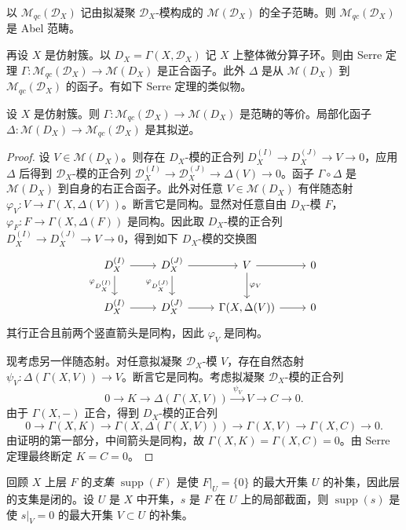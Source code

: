以 $\mathcal{M}_{qc}(\mathcal{D}_X)$ 记由拟凝聚 $\mathcal{D}_X$-模构成的 $\mathcal{M}(\mathcal{D}_X)$ 的全子范畴。则 $\mathcal{M}_{qc}(\mathcal{D}_X)$ 是 Abel 范畴。

再设 $X$ 是仿射簇。以 $D_X=\Gamma(X,\mathcal{D}_X)$ 记 $X$ 上整体微分算子环。则由 Serre 定理 $\Gamma:\mathcal{M}_{qc}(\mathcal{D}_X)\to\mathcal{M}(D_X)$ 是正合函子。此外 $\Delta$ 是从 $\mathcal{M}(D_X)$ 到 $\mathcal{M}_{qc}(\mathcal{D}_X)$ 的函子。有如下 Serre 定理的类似物。

\begin{theorem}
设 $X$ 是仿射簇。则 $\Gamma:\mathcal{M}_{qc}(\mathcal{D}_X)\to\mathcal{M}(D_X)$ 是范畴的等价。局部化函子 $\Delta:\mathcal{M}(D_X)\to\mathcal{M}_{qc}(\mathcal{D}_X)$ 是其拟逆。
\end{theorem}

\begin{proof}
设 $V\in\mathcal{M}(D_X)$。则存在 $D_X$-模的正合列 $D_X^{(I)}\to D_X^{(J)}\to V\to 0$，应用 $\Delta$ 后得到 $\mathcal{D}_X$-模的正合列 $\mathcal{D}_X^{(I)}\to\mathcal{D}_X^{(J)}\to\Delta(V)\to 0$。函子 $\Gamma\circ\Delta$ 是 $\mathcal{M}(D_X)$ 到自身的右正合函子。此外对任意 $V\in\mathcal{M}(D_X)$ 有伴随态射 $\varphi_V:V\to\Gamma(X,\Delta(V))$。断言它是同构。显然对任意自由 $D_X$-模 $F$，$\varphi_F:F\to\Gamma(X,\Delta(F))$ 是同构。因此取 $D_X$-模的正合列 $D_X^{(I)}\to D_X^{(J)}\to V\to 0$，得到如下 $D_X$-模的交换图
$$\begin{tikzcd}
D_X^{(I)} \arrow[r] \arrow[d,"\varphi_{D_X^{(I)}}"'] & D_X^{(J)} \arrow[r] \arrow[d,"\varphi_{D_X^{(J)}}"'] & V \arrow[r] \arrow[d,"\varphi_V"] & 0\\
D_X^{(I)} \arrow[r] & D_X^{(J)} \arrow[r] & \Gamma(X,\Delta(V)) \arrow[r] & 0
\end{tikzcd}$$
其行正合且前两个竖直箭头是同构，因此 $\varphi_V$ 是同构。

现考虑另一伴随态射。对任意拟凝聚 $\mathcal{D}_X$-模 $V$，存在自然态射 $\psi_V:\Delta(\Gamma(X,V))\to V$。断言它是同构。考虑拟凝聚 $\mathcal{D}_X$-模的正合列
$$0\longrightarrow K\longrightarrow\Delta(\Gamma(X,V))\xrightarrow{\ \psi_V\ }V\longrightarrow C\longrightarrow 0.$$
由于 $\Gamma(X,-)$ 正合，得到 $D_X$-模的正合列
$$0\to\Gamma(X,K)\to\Gamma(X,\Delta(\Gamma(X,V)))\to\Gamma(X,V)\to\Gamma(X,C)\to 0.$$
由证明的第一部分，中间箭头是同构，故 $\Gamma(X,K)=\Gamma(X,C)=0$。由 Serre 定理最终断定 $K=C=0$。
\end{proof}

回顾 $X$ 上层 $F$ 的\emph{支集} $\operatorname{supp}(F)$ 是使 $F|_U=\{0\}$ 的最大开集 $U$ 的补集，因此层的支集是闭的。设 $U$ 是 $X$ 中开集，$s$ 是 $F$ 在 $U$ 上的局部截面，则 $\operatorname{supp}(s)$ 是使 $s|_V=0$ 的最大开集 $V\subset U$ 的补集。

